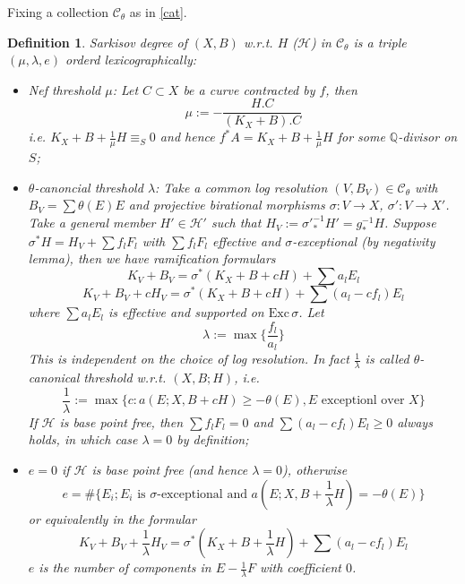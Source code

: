 \documentclass{article}
\newtheorem{defn}{Definition}[section]
\begin{document}
Fixing a collection $ \mathcal{C}_\theta $ as in \ref{cat}. 
\begin{defn}
	Sarkisov degree of $ (X,B) $ w.r.t. $ H $ ($ \mathcal{H} $) in $ \mathcal{C}_\theta $ is a triple $ (\mu,\lambda,e) $ orderd lexicographically:
	\begin{itemize}
		\item Nef threshold $ \mu $: Let $ C\subset X  $ be a curve contracted by $ f $, then 
		$$ \mu:=-\frac{H.C}{(K_X+B).C} $$
		i.e. $ K_X+B+\frac{1}{\mu} H \equiv_S0$ and hence $ f^*A=K_X+B+\frac{1}{\mu} H $ for some $ \mathbb{Q} $-divisor on $ S $;
		\item $ \theta $-canoncial threshold $ \lambda $: Take a common log resolution  $ (V,B_V)\in \mathcal{C}_\theta $ with $ B_V=\sum \theta(E)E $ and projective birational morphisms $ \sigma:V\to X $, $ \sigma':V\to X' $. Take a general member $ H'\in \mathcal{H}' $ such that $ H_V:=\sigma'^{-1}_*H'=g^{-1}_*H $. Suppose $ \sigma^*H=H_V+\sum f_lF_l $ with $ \sum f_lF_l $ effective and $ \sigma $-exceptional (by negativity lemma), then we have ramification formulars
		$$ K_V+B_V=\sigma^*(K_X+B+cH)+\sum a_lE_l  $$
		$$ K_V+B_V+cH_V=\sigma^*(K_X+B+cH)+\sum(a_l-cf_l)E_l $$
		where $ \sum a_lE_l $ is effective and supported on $ \mathrm{Exc}\,\sigma $.   Let
		$$ \lambda:=\max\{ \frac{f_l}{a_l}\} $$
		This is independent on the choice of log resolution. In fact $ \frac{1}{\lambda} $ is called $ \theta $-canonical threshold w.r.t. $ (X,B;H) $, i.e.
		$$ \frac{1}{\lambda}:=\max\{c:a(E;X,B+cH)\geqslant-\theta(E) ,E\text{ exceptionl over }X \}$$ 
		If $ \mathcal{H} $ is base point free, then $ \sum f_lF_l=0 $ and $\sum(a_l-cf_l)E_l\geqslant 0  $ always holds, in which case $ \lambda=0 $ by definition;
		\item $ e=0 $ if $ \mathcal{H} $ is base point free (and hence $ \lambda=0 $), otherwise 
		$$ e=\#\{E_i; E_i \text{ is }\sigma\text{-exceptional and } a(E;X,B+\frac{1}{\lambda} H)=-\theta(E) \} $$
		or equivalently in the formular 
		$$ K_V+B_V+\frac{1}{\lambda} H_V=\sigma^*(K_X+B+\frac{1}{\lambda} H)+\sum(a_l-cf_l)E_l $$
		$ e $ is the number of components in $ E-\frac{1}{\lambda} F $ with coefficient $ 0 $. 
	\end{itemize}
\end{defn}
\end{document}
